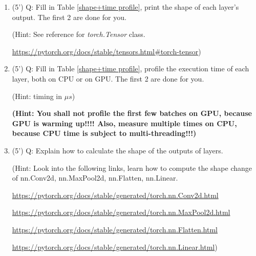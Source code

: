 \documentclass[12pt,a4paper]{article}
\theoremstyle{definition}
\begin{document}
\begin{enumerate}
    \item (5') Q: Fill in Table \ref{shape+time profile}, print the shape of each layer's output. The first 2 are done for you.

    (Hint: See reference for \textit{torch.Tensor} class.

    \href{torch.Tensor}{https://pytorch.org/docs/stable/tensors.html\#torch-tensor})
    
    \item (5') Q: Fill in Table \ref{shape+time profile}, profile the execution time of each layer, both on CPU or on GPU. The first 2 are done for you. 
    
    (Hint: timing in $\mu s$)
    
\textbf{    (Hint: You shall not profile the first few batches on GPU, because GPU is warming up!!!! Also, measure multiple times on CPU, because CPU time is subject to multi-threading!!!)}
    
    \item (5') Q: Explain how to calculate the shape of the outputs of layers.
    
    (Hint: Look into the following links, learn how to compute the shape change of nn.Conv2d, nn.MaxPool2d, nn.Flatten, nn.Linear. 

    \href{nn.Conv2d}{https://pytorch.org/docs/stable/generated/torch.nn.Conv2d.html}

    \href{nn.MaxPool2d}{https://pytorch.org/docs/stable/generated/torch.nn.MaxPool2d.html}

    \href{nn.Flatten}{https://pytorch.org/docs/stable/generated/torch.nn.Flatten.html}

    \href{nn.Linear}{https://pytorch.org/docs/stable/generated/torch.nn.Linear.html})
    
\end{enumerate}
\end{document}
